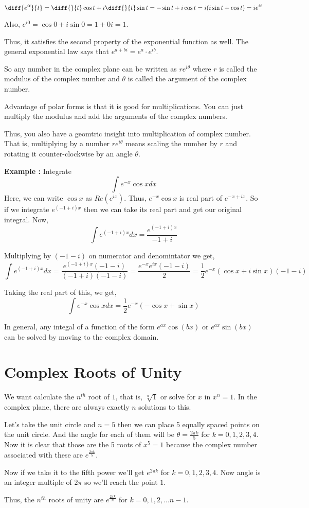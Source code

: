 $$
\diff{e^{i t}}{t} = \diff{}{t} \cos t + i \diff{}{t} \sin t
    = - \sin t + i \cos t
    = i ( i \sin t + \cos t)
    = i e^{it}
$$

Also, $e^{i 0} = \cos 0 + i \sin 0 = 1 + 0 i = 1 $.

Thus, it satisfies the second property of the exponential function as well.
The general exponential law says that $e^{a+bi} = e^a \cdot e^{ib}$.

So any number in the complex plane can be written as $re^{i \theta}$
where $r$ is called the modulus of the complex number 
and $\theta$ is called the argument of the complex number.

Advantage of polar forms is that it is good for multiplications. 
You can just multiply the modulus and add the arguments of the complex numbers.

Thus, you also have a geomtric insight into multiplication of complex number.
That is, multiplying by a number $r e^{i \theta}$ means scaling the number by $r$ 
and rotating it counter-clockwise by an angle $\theta$.


{\bf Example : } Integrate 
$$ \int e^{-x} \cos x dx $$
Here, we can write $\cos x$ as $Re(e^{ix})$. 
Thus, $e^{-x} \cos x$ is real part of $e^{-x + ix}$.
So if we integrate $e^{(-1+i)x}$ then we can take its real part and get our original integral.
Now, 
$$
\int e^{(-1+i)x} dx = \frac{e^{(-1+i)x}}{-1+i}
$$

Multiplying by $(-1-i)$ on numerator and denomintator we get, 
$$
\int e^{(-1+i)x} dx = \frac{ e^{(-1+i)x} (-1-i) }{(-1+i)(-1-i)}
= \frac{ e^{-x}e^{ix}(-1-i) }{ 2 }
= \frac{1}{2} e^{-x} (\cos x + i \sin x)(-1-i)
$$

Taking the real part of this, we get,
$$ 
\int e^{-x} \cos x dx 
    = \frac{1}{2} e^{-x} ( - \cos x + \sin x) 
$$

In general, any integal of a function of the form $e^{ax} \cos (bx)$ or $e^{ax} \sin (bx)$ 
can be solved by moving to the complex domain.


\section{Complex Roots of Unity}

We want calculate the $n^{th}$ root of $1$, that is, $\sqrt[n]{1}$ or solve for $x$ in $x^n = 1$.
In the complex plane, there are always exactly $n$ solutions to this.

Let's take the unit circle and $n = 5$ then we can place 5 equally spaced points on the unit circle.
And the angle for each of them will be $\theta = \frac{2 \pi k}{5}$ for $k = 0, 1, 2, 3, 4$.
Now it is clear that those are the 5 roots of $x^5 = 1$ because the complex number associated with these
are $e^{\frac{2 \pi k}{5}}$. 

Now if we take it to the fifth power we'll get $e^{2 \pi k}$ for $k = 0, 1, 2, 3, 4$.
Now angle is an integer multiple of $2 \pi$ so we'll reach the point $1$. 

Thus, the $n^{th}$ roots of unity are $e^{\frac{2 \pi k}{n}}$ for $k = 0, 1, 2, ... n-1$.


